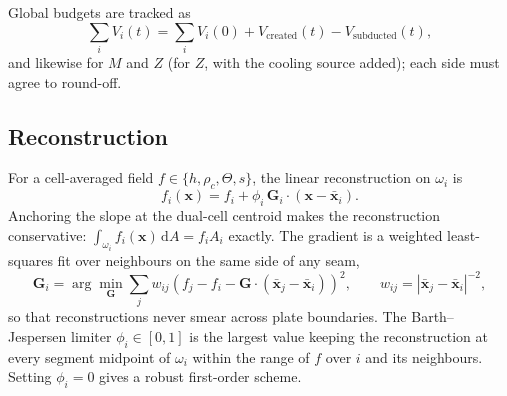 \documentclass[11pt]{article}
\newcommand{\vect}[1]{\mathbf{#1}}
\newcommand{\dd}{\,\mathrm{d}}
\begin{document}
Global budgets are tracked as
\begin{equation}
  \sum_i V_i(t) = \sum_i V_i(0) + V_{\mathrm{created}}(t) - V_{\mathrm{subducted}}(t),
\end{equation}
and likewise for $M$ and $Z$ (for $Z$, with the cooling source added); each side must agree to round-off.

\subsection{Reconstruction}
For a cell-averaged field $f\in\{h,\rho_c,\Theta,s\}$, the linear reconstruction on $\omega_i$ is
\begin{equation}
  f_i(\vect{x}) = f_i + \phi_i\,\vect{G}_i\cdot(\vect{x}-\bar{\vect{x}}_i).
  \label{eq:recon}
\end{equation}
Anchoring the slope at the dual-cell centroid makes the reconstruction conservative: $\int_{\omega_i}f_i(\vect{x})\dd A=f_iA_i$ exactly. The gradient is a weighted least-squares fit over neighbours on the same side of any seam,
\begin{equation}
  \vect{G}_i=\arg\min_{\vect{G}}\sum_j w_{ij}\left(f_j-f_i-\vect{G}\cdot(\bar{\vect{x}}_j-\bar{\vect{x}}_i)\right)^2,
  \qquad w_{ij}=|\bar{\vect{x}}_j-\bar{\vect{x}}_i|^{-2},
\end{equation}
so that reconstructions never smear across plate boundaries. The Barth--Jespersen limiter $\phi_i\in[0,1]$ is the largest value keeping the reconstruction at every segment midpoint of $\omega_i$ within the range of $f$ over $i$ and its neighbours. Setting $\phi_i=0$ gives a robust first-order scheme.
\end{document}
